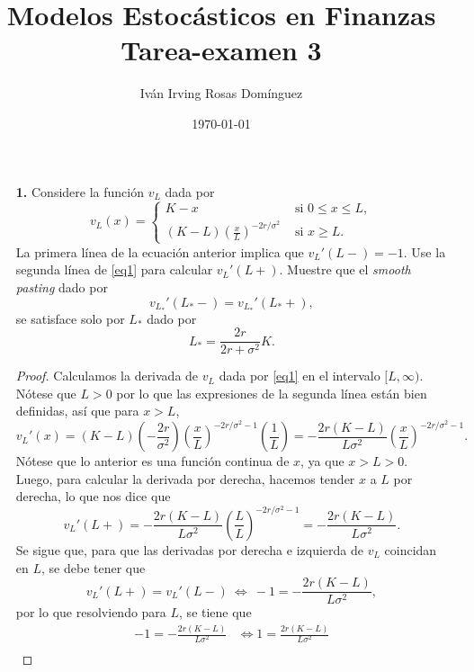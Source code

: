 \documentclass[letterpaper]{article}
\title{\textbf{Modelos Estocásticos en Finanzas\\
Tarea-examen 3}}
\author{Iván Irving Rosas Domínguez}
\date{\today}
\newcommand{\1}{\mathds{1}}
\theoremstyle{definition}
\theoremstyle{definition}
\theoremstyle{definition}
\theoremstyle{definition}
\theoremstyle{definition}
\begin{document}
\maketitle


\begin{itemize}
    \item[\textbf{1.}] Considere la función $v_L$ dada por 
    \begin{equation}\label{eq1}
        v_L(x)=
        \begin{cases}
            K-x & \text{ si } 0\leq x \leq L,\\
            (K-L)\left(\frac{x}{L}\right)^{-2r/\sigma^2} & \text{ si } x\geq L.
        \end{cases}    
    \end{equation}
    La primera línea de la ecuación anterior implica que $v_L'(L-)=-1$. Use la segunda 
    línea de \eqref{eq1} para calcular $v_L'(L+)$. Muestre que el \textit{smooth pasting} dado por 
    \[
    v_{L_*}'(L_*-)=v_{L_*}'(L_*+),
    \]
    se satisface solo por $L_*$ dado por 
    \begin{equation}\label{eq6}
        L_*=\frac{2r}{2r+\sigma^2}K.
    \end{equation}
    \begin{proof} 
      Calculamos la derivada de $v_L$ dada por \eqref{eq1} en el intervalo $[L,\infty)$. Nótese que $L>0$ por lo que las expresiones 
      de la segunda línea están bien definidas, así que para $x>L$, 
      \[
        v_L'(x)=(K-L)\left(-\frac{2r}{\sigma^2}\right)\left(\frac{x}{L}\right)^{-2r/\sigma^2-1}\left(\frac{1}{L}\right)=-\frac{2r(K-L)}{L\sigma^2}\left(\frac{x}{L}\right)^{-2r/\sigma^2-1}.
      \]
      Nótese que lo anterior es una función continua de $x$, ya que $x>L>0$. Luego, para calcular la derivada por derecha, hacemos
      tender $x$ a $L$ por derecha, lo que nos dice que 
      \[
      v_L'(L+)=-\frac{2r(K-L)}{L\sigma^2}\left(\frac{L}{L}\right)^{-2r/\sigma^2-1}=-\frac{2r(K-L)}{L\sigma^2}.
      \]
      Se sigue que, para que las derivadas por derecha e izquierda de $v_L$ coincidan en $L$, se debe tener que 
      \[
      v_L'(L+)=v_L'(L-) \ \iff  \ -1= -\frac{2r(K-L)}{L\sigma^2},
      \]
      por lo que resolviendo para $L$, se tiene que 
      \begin{align*}
        -1= -\frac{2r(K-L)}{L\sigma^2} &\iff 1= \frac{2r(K-L)}{L\sigma^2}\\

\end{align*}
\end{proof}
\end{itemize}
\end{document}
